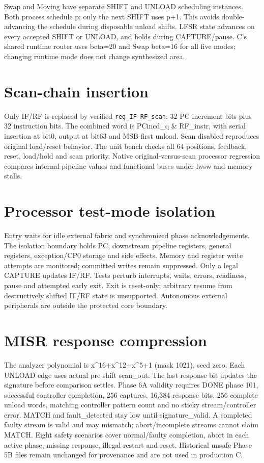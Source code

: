 \documentclass[11pt,a4paper]{article}
\begin{document}
Swap and Moving have separate SHIFT and UNLOAD scheduling instances. Both process schedule p; only the next SHIFT uses p+1. This avoids double-advancing the schedule during disposable unload shifts. LFSR state advances on every accepted SHIFT or UNLOAD, and holds during CAPTURE/pause. C's shared runtime router uses beta=20 and Swap beta=16 for all five modes; changing runtime mode does not change synthesized area.



\section{Scan-chain insertion}


Only IF/RF is replaced by verified \texttt{reg\_IF\_RF\_scan}: 32 PC-increment bits plus 32 instruction bits. The combined word is PCincd\_q \& RF\_instr, with serial insertion at bit0, output at bit63 and MSB-first unload. Scan disabled reproduces original load/reset behavior. The unit bench checks all 64 positions, feedback, reset, load/hold and scan priority. Native original-versus-scan processor regression compares internal pipeline values and functional buses under lwsw and memory stalls.



\section{Processor test-mode isolation}


Entry waits for idle external fabric and synchronized phase acknowledgements. The isolation boundary holds PC, downstream pipeline registers, general registers, exception/CP0 storage and side effects. Memory and register write attempts are monitored; committed writes remain suppressed. Only a legal CAPTURE updates IF/RF. Tests perturb interrupts, waits, errors, readiness, pause and attempted early exit. Exit is reset-only; arbitrary resume from destructively shifted IF/RF state is unsupported. Autonomous external peripherals are outside the protected core boundary.



\section{MISR response compression}


The analyzer polynomial is x\textasciicircum{}16+x\textasciicircum{}12+x\textasciicircum{}5+1 (mask 1021), seed zero. Each UNLOAD edge uses actual pre-shift scan\_out. The last response bit updates the signature before comparison settles. Phase 6A validity requires DONE phase 101, successful controller completion, 256 captures, 16,384 response bits, 256 complete unload words, matching controller pattern count and no sticky stream/controller error. MATCH and fault\_detected stay low until signature\_valid. A completed faulty stream is valid and may mismatch; abort/incomplete streams cannot claim MATCH. Eight safety scenarios cover normal/faulty completion, abort in each active phase, missing response, illegal restart and reset. Historical unsafe Phase 5B files remain unchanged for provenance and are not used in production C.
\end{document}
